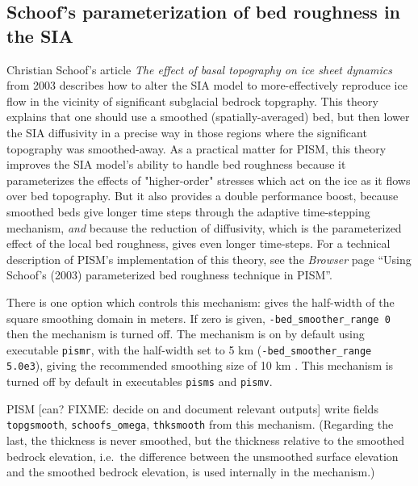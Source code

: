 \subsection{Schoof's parameterization of bed roughness in the SIA} \label{subsect:bedsmooth} 

Christian Schoof's article \emph{The effect of basal topography on ice sheet dynamics} from 2003 \cite{Schoofbasaltopg2003} describes how to alter the SIA model to more-effectively reproduce ice flow in the vicinity of significant subglacial bedrock topgraphy.  This theory explains that one should use a smoothed (spatially-averaged) bed, but then lower the SIA diffusivity in a precise way in those regions where the significant topography was smoothed-away.  As a practical matter for PISM, this theory improves the SIA model's ability to handle bed roughness because it parameterizes the effects of "higher-order" stresses which act on the ice as it flows over bed topography.   But it also provides a double performance boost, because smoothed beds give longer time steps through the adaptive time-stepping mechanism, \emph{and} because the reduction of diffusivity, which is the parameterized effect of the local bed roughness, gives even longer time-steps.  For a technical description of PISM's implementation of this theory, see the \emph{Browser} page ``Using Schoof's (2003) parameterized bed roughness technique in PISM''.

There is one option which controls this mechanism:  gives the half-width of the square smoothing domain in meters.  If zero is given, \texttt{-bed_smoother_range 0} then the mechanism is turned off.  The mechanism is on by default using executable \texttt{pismr}, with the half-width set to 5 km (\texttt{-bed_smoother_range 5.0e3}), giving the recommended smoothing size of 10 km \cite{Schoofbasaltopg2003}.  This mechanism is turned off by default in executables \texttt{pisms} and \texttt{pismv}.

PISM [can? FIXME: decide on and document relevant outputs] write fields \texttt{topgsmooth}, \texttt{schoofs_omega}, \texttt{thksmooth} from this mechanism.  (Regarding the last, the thickness is never smoothed, but the thickness relative to the smoothed bedrock elevation, i.e.~the difference between the unsmoothed surface elevation and the smoothed bedrock elevation, is used internally in the mechanism.)


